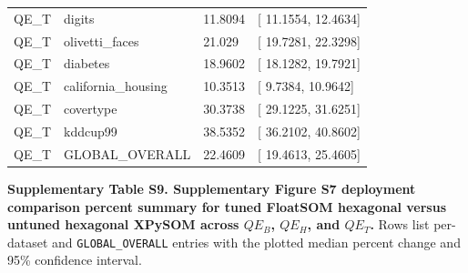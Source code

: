 \documentclass[
]{article}
\providecommand{\DIFadd}[1]{{\protect\color{blue} #1}} %
\providecommand{\DIFaddbegin}{} %
\providecommand{\DIFaddend}{} %
\begin{document}
{\begin{longtable}[]{@{}llll@{}}
\DIFadd{QE\_T }& \DIFadd{digits }& \DIFadd{11.8094 }& {[}\DIFadd{11.1554, 12.4634}{]} \\
\DIFadd{QE\_T }& \DIFadd{olivetti\_faces }& \DIFadd{21.029 }& {[}\DIFadd{19.7281, 22.3298}{]} \\
\DIFadd{QE\_T }& \DIFadd{diabetes }& \DIFadd{18.9602 }& {[}\DIFadd{18.1282, 19.7921}{]} \\
\DIFadd{QE\_T }& \DIFadd{california\_housing }& \DIFadd{10.3513 }& {[}\DIFadd{9.7384, 10.9642}{]} \\
\DIFadd{QE\_T }& \DIFadd{covertype }& \DIFadd{30.3738 }& {[}\DIFadd{29.1225, 31.6251}{]} \\
\DIFadd{QE\_T }& \DIFadd{kddcup99 }& \DIFadd{38.5352 }& {[}\DIFadd{36.2102, 40.8602}{]} \\
\DIFadd{QE\_T }& \DIFadd{GLOBAL\_OVERALL }& \DIFadd{22.4609 }& {[}\DIFadd{19.4613, 25.4605}{]} \\
\end{longtable}
}

\DIFaddend \textbf{Supplementary Table S9. Supplementary Figure  \DIFaddbegin \DIFadd{S7 }\DIFaddend deployment
comparison percent summary for tuned FloatSOM hexagonal versus  \DIFaddbegin \DIFadd{untuned
}\DIFaddend hexagonal XPySOM across \(QE_B\), \(QE_H\), and \(QE_T\).} Rows list
per-dataset and \texttt{GLOBAL\_OVERALL} entries with the plotted median
percent change and 95\% confidence interval.
\end{document}
